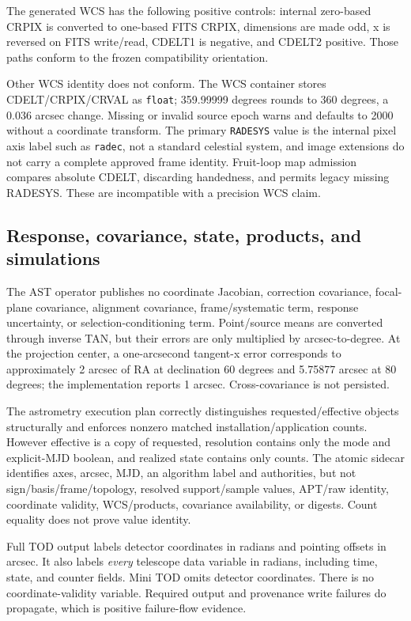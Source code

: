 \documentclass[11pt]{article}
\newcommand{\code}[1]{\nolinkurl{#1}}
\begin{document}
The generated WCS has the following positive controls: internal zero-based
CRPIX is converted to one-based FITS CRPIX, dimensions are made odd, x is
reversed on FITS write/read, CDELT1 is negative, and CDELT2 positive. Those
paths conform to the frozen compatibility orientation.

Other WCS identity does not conform. The WCS container stores CDELT/CRPIX/CRVAL
as \code{float}; 359.99999 degrees rounds to 360 degrees, a 0.036 arcsec
change. Missing or invalid source epoch warns and defaults to 2000 without a
coordinate transform. The primary \code{RADESYS} value is the internal pixel
axis label such as \code{radec}, not a standard celestial system, and image
extensions do not carry a complete approved frame identity. Fruit-loop map
admission compares absolute CDELT, discarding handedness, and permits legacy
missing RADESYS. These are incompatible with a precision WCS claim.

\subsection{Response, covariance, state, products, and simulations}

The AST operator publishes no coordinate Jacobian, correction covariance,
focal-plane covariance, alignment covariance, frame/systematic term, response
uncertainty, or selection-conditioning term. Point/source means are converted
through inverse TAN, but their errors are only multiplied by arcsec-to-degree.
At the projection center, a one-arcsecond tangent-x error corresponds to
approximately 2 arcsec of RA at declination 60 degrees and 5.75877 arcsec at
80 degrees; the implementation reports 1 arcsec. Cross-covariance is not
persisted.

The astrometry execution plan correctly distinguishes requested/effective
objects structurally and enforces nonzero matched installation/application
counts. However effective is a copy of requested, resolution contains only the
mode and explicit-MJD boolean, and realized state contains only counts. The
atomic sidecar identifies axes, arcsec, MJD, an algorithm label and authorities,
but not sign/basis/frame/topology, resolved support/sample values, APT/raw
identity, coordinate validity, WCS/products, covariance availability, or
digests. Count equality does not prove value identity.

Full TOD output labels detector coordinates in radians and pointing offsets in
arcsec. It also labels \emph{every} telescope data variable in radians,
including time, state, and counter fields. Mini TOD omits detector coordinates.
There is no coordinate-validity variable. Required output and provenance write
failures do propagate, which is positive failure-flow evidence.
\end{document}
